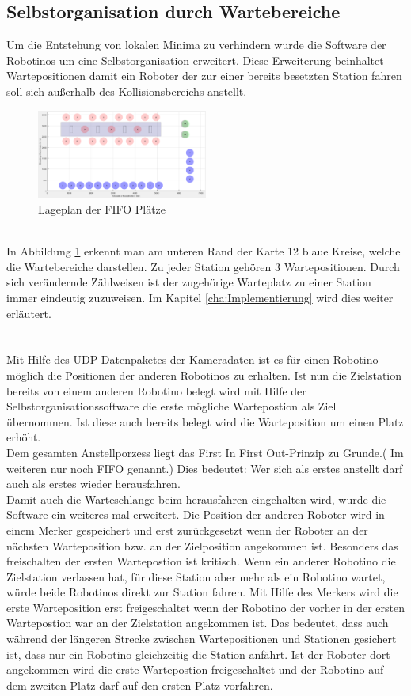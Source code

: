 \subsection{Selbstorganisation durch Wartebereiche}
\label{subsec:Selbstorga}
Um die Entstehung von lokalen Minima zu verhindern wurde die Software der Robotinos um eine Selbstorganisation erweitert. 
Diese Erweiterung beinhaltet Wartepositionen damit ein Roboter der zur einer bereits besetzten Station fahren soll sich außerhalb des Kollisionsbereichs anstellt.
\begin{figure}[h]
	\centering
	\includegraphics[width=0.5\textwidth]{Bilder/Lageplan.png}
	\caption{Lageplan der FIFO Plätze}
	\label{FIFOPlan}
\end{figure}
\\
In Abbildung \ref{FIFOPlan} erkennt man am unteren Rand der Karte 12 blaue Kreise, welche die Wartebereiche darstellen. Zu jeder Station gehören 3 Wartepositionen. Durch sich verändernde Zählweisen ist der zugehörige Warteplatz zu einer Station immer eindeutig zuzuweisen. Im Kapitel \ref{cha:Implementierung} wird dies weiter erläutert.\\
\\
\\
Mit Hilfe des UDP-Datenpaketes der Kameradaten  ist es für einen Robotino möglich die Positionen der anderen Robotinos zu erhalten. Ist nun die Zielstation bereits von einem anderen Robotino belegt wird mit Hilfe der Selbstorganisationssoftware die erste mögliche Wartepostion als Ziel übernommen. Ist diese auch bereits belegt wird die Warteposition um einen Platz erhöht.\\
Dem gesamten Anstellporzess liegt das First In First Out-Prinzip zu Grunde.( Im weiteren nur noch FIFO genannt.)
Dies bedeutet: Wer sich als erstes anstellt darf auch als erstes wieder herausfahren.\\
Damit auch die Warteschlange beim herausfahren eingehalten wird, wurde die Software ein weiteres mal erweitert.
Die Position der anderen Roboter wird in einem Merker gespeichert und erst zurückgesetzt wenn der Roboter an der nächsten Warteposition bzw. an der Zielposition angekommen ist. Besonders das freischalten der ersten Wartepostion ist kritisch. Wenn ein anderer Robotino die Zielstation verlassen hat, für diese Station aber mehr als ein Robotino wartet, würde beide Robotinos direkt zur Station fahren. Mit Hilfe des Merkers wird die erste Warteposition erst freigeschaltet wenn der Robotino der vorher in der ersten Wartepostion war an der Zielstation angekommen ist. Das bedeutet, dass auch während der längeren Strecke zwischen Wartepositionen und Stationen gesichert ist, dass nur ein Robotino gleichzeitig die Station anfährt. Ist der Roboter dort angekommen wird die erste Wartepostion freigeschaltet und der Robotino auf dem zweiten Platz darf auf den ersten Platz vorfahren.\\
